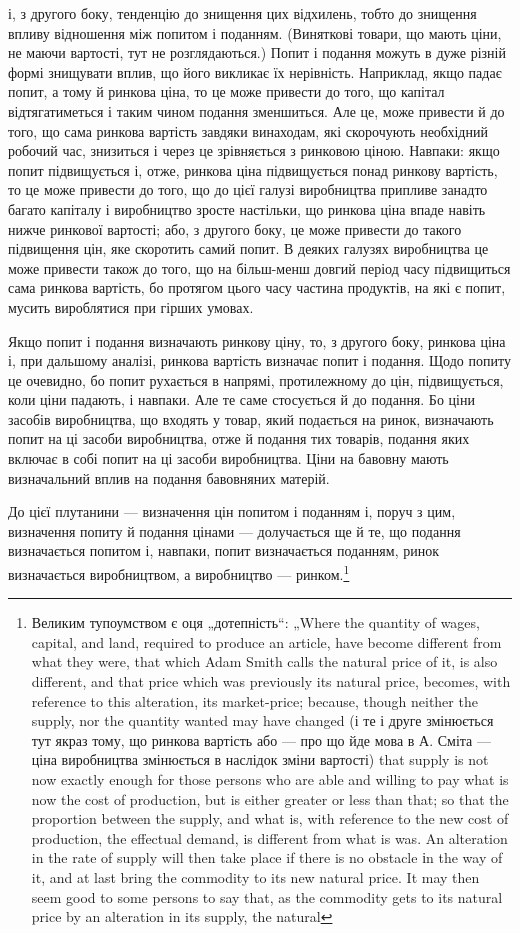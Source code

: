 і, з другого боку, тенденцію до знищення цих відхилень, тобто
до знищення впливу відношення між попитом і поданням. (Виняткові
товари, що мають ціни, не маючи вартості, тут не розглядаються.)
Попит і подання можуть в дуже різній формі
знищувати вплив, що його викликає їх нерівність. Наприклад,
якщо падає попит, а тому й ринкова ціна, то це може привести
до того, що капітал відтягатиметься і таким чином подання
зменшиться. Але це, може привести й до того, що сама ринкова
вартість завдяки винаходам, які скорочують необхідний робочий
час, знизиться і через це зрівняється з ринковою ціною. Навпаки:
якщо попит підвищується і, отже, ринкова ціна підвищується
понад ринкову вартість, то це може привести до того,
що до цієї галузі виробництва припливе занадто багато капіталу
і виробництво зросте настільки, що ринкова ціна впаде
навіть нижче ринкової вартості; або, з другого боку, це може
привести до такого підвищення цін, яке скоротить самий попит.
В деяких галузях виробництва це може привести також до
того, що на більш-менш довгий період часу підвищиться сама
ринкова вартість, бо протягом цього часу частина продуктів,
на які є попит, мусить вироблятися при гірших умовах.

Якщо попит і подання визначають ринкову ціну, то, з другого
боку, ринкова ціна і, при дальшому аналізі, ринкова вартість
визначає попит і подання. Щодо попиту це очевидно, бо
попит рухається в напрямі, протилежному до цін, підвищується,
коли ціни падають, і навпаки. Але те саме стосується й до
подання. Бо ціни засобів виробництва, що входять у товар, який
подається на ринок, визначають попит на ці засоби виробництва,
отже й подання тих товарів, подання яких включає в собі
попит на ці засоби виробництва. Ціни на бавовну мають визначальний
вплив на подання бавовняних матерій.

До цієї плутанини — визначення цін попитом і поданням і,
поруч з цим, визначення попиту й подання цінами — долучається
ще й те, що подання визначається попитом і, навпаки,
попит визначається поданням, ринок визначається виробництвом,
а виробництво — ринком.\footnote{
Великим тупоумством є оця „дотепність“: „Where the quantity of wages,
capital, and land, required to produce an article, have become different from what
they were, that which Adam Smith calls the natural price of it, is also different,
and that price which was previously its natural price, becomes, with reference to
this alteration, its market-price; because, though neither the supply, nor the quantity
wanted may have changed (і те і друге змінюється тут якраз тому, що
ринкова вартість або — про що йде мова в А. Сміта — ціна виробництва змінюється
в наслідок зміни вартості) that supply is not now exactly enough for
those persons who are able and willing to pay what is now the cost of production,
but is either greater or less than that; so that the proportion between the supply,
and what is, with reference to the new cost of production, the effectual demand,
is different from what is was. An alteration in the rate of supply will then take
place if there is no obstacle іn the way of it, and at last bring the commodity
to its new natural price. It may then seem good to some persons to say that, as
the commodity gets to its natural price by an alteration in its supply, the natural
}